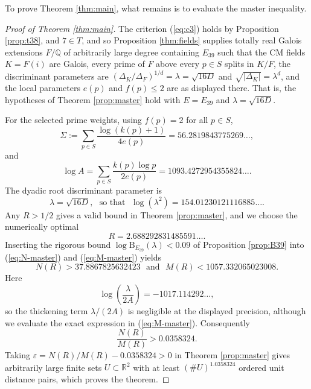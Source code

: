 To prove Theorem \ref{thm:main}, what remains is to evaluate the master inequality.
\begin{proof}[Proof of Theorem \ref{thm:main}]
The criterion (\ref{eq:c3}) holds by Proposition \ref{prop:t38}, and $7\in T$, and so Proposition \ref{thm:fields} supplies totally real Galois extensions $F/\mathbb{Q}$ of arbitrarily large degree containing $E_{39}$ such that the CM fields $K=F(i)$ are Galois, every prime of $F$ above every $p\in S$ splits in $K/F$, the discriminant parameters are $(\Delta_K/\Delta_F)^{1/d}=\lambda=\sqrt{16D}$ and $\sqrt{|\Delta_K|}=\lambda^d$, and the local parameters $e(p)$ and $f(p)\leq2$ are as displayed there.  That is, the hypotheses of Theorem \ref{prop:master} hold with $E=E_{39}$ and $\lambda=\sqrt{16D}$.

For the selected prime weights, using $f(p)=2$ for all $p\in S$,
\begin{equation}\label{eq:sigma-sum}
   \Sigma:=\sum_{p\in S}\frac{\log(k(p)+1)}{4e(p)}
   =56.2819843775269\ldots,
\end{equation}
and
\begin{equation}\label{eq:logA-sum}
   \log A=\sum_{p\in S}\frac{k(p)\log p}{2e(p)}
   =1093.4272954355824\ldots .
\end{equation}
The dyadic root discriminant parameter is
\[
   \lambda=\sqrt{16D},\ \ \ \text{so that}\ \ \ \log(\lambda^2)=154.01230121116885\ldots.
\]
Any $R>1/2$ gives a valid bound in Theorem \ref{prop:master}, and we choose the numerically optimal
\[
   R=2.688292831485591\ldots.
\]
Inserting the rigorous bound $\log\mathrm{B}_{E_{39}}(\lambda)<0.09$ of Proposition \ref{prop:B39} into (\ref{eq:N-master}) and (\ref{eq:M-master}) yields
\[
   N(R)>37.8867825632423\ \ \ \text{and}\ \ \ M(R)<1057.332065023008.
\]
Here
\[
   \log\left(\frac{\lambda}{2A}\right)=-1017.114292\ldots,
\]
so the thickening term $\lambda/(2A)$ is negligible at the displayed precision, although we evaluate the exact expression in (\ref{eq:M-master}).  Consequently
\[
   \frac{N(R)}{M(R)}>0.0358324.
\]
Taking $\varepsilon=N(R)/M(R)-0.0358324>0$ in Theorem \ref{prop:master} gives arbitrarily large finite sets $U\subset\mathbb{R}^2$ with at least $(\#U)^{1.0358324}$ ordered unit distance pairs, which proves the theorem.
\end{proof}
